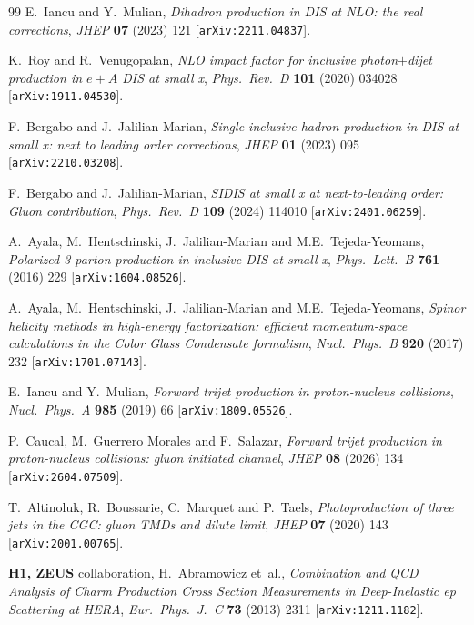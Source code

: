 \documentclass[11pt,a4paper]{article}
\numberwithin{equation}{section}
\begin{document}
\begin{thebibliography}{99}
E.~Iancu and Y.~Mulian, \emph{Dihadron production in DIS at NLO: the real corrections},
\emph{JHEP} {\bf 07} (2023) 121 [\texttt{arXiv:2211.04837}].

K.~Roy and R.~Venugopalan, \emph{NLO impact factor for inclusive photon$+$dijet production in
$e+A$ DIS at small x}, \emph{Phys.\ Rev.\ D} {\bf 101} (2020) 034028
[\texttt{arXiv:1911.04530}].

F.~Bergabo and J.~Jalilian-Marian, \emph{Single inclusive hadron production in DIS at small
x: next to leading order corrections}, \emph{JHEP} {\bf 01} (2023) 095
[\texttt{arXiv:2210.03208}].

F.~Bergabo and J.~Jalilian-Marian, \emph{SIDIS at small x at next-to-leading order: Gluon
contribution}, \emph{Phys.\ Rev.\ D} {\bf 109} (2024) 114010 [\texttt{arXiv:2401.06259}].

A.~Ayala, M.~Hentschinski, J.~Jalilian-Marian and M.E.~Tejeda-Yeomans, \emph{Polarized 3
parton production in inclusive DIS at small x}, \emph{Phys.\ Lett.\ B} {\bf 761} (2016) 229
[\texttt{arXiv:1604.08526}].

A.~Ayala, M.~Hentschinski, J.~Jalilian-Marian and M.E.~Tejeda-Yeomans, \emph{Spinor helicity
methods in high-energy factorization: efficient momentum-space calculations in the Color
Glass Condensate formalism}, \emph{Nucl.\ Phys.\ B} {\bf 920} (2017) 232
[\texttt{arXiv:1701.07143}].

E.~Iancu and Y.~Mulian, \emph{Forward trijet production in proton-nucleus collisions},
\emph{Nucl.\ Phys.\ A} {\bf 985} (2019) 66 [\texttt{arXiv:1809.05526}].

P.~Caucal, M.~Guerrero Morales and F.~Salazar, \emph{Forward trijet production in
proton-nucleus collisions: gluon initiated channel}, \emph{JHEP} {\bf 08} (2026) 134
[\texttt{arXiv:2604.07509}].

T.~Altinoluk, R.~Boussarie, C.~Marquet and P.~Taels, \emph{Photoproduction of three jets in
the CGC: gluon TMDs and dilute limit}, \emph{JHEP} {\bf 07} (2020) 143
[\texttt{arXiv:2001.00765}].

{\bf H1, ZEUS} collaboration, H.~Abramowicz et~al., \emph{Combination and QCD Analysis of
Charm Production Cross Section Measurements in Deep-Inelastic ep Scattering at HERA},
\emph{Eur.\ Phys.\ J.\ C} {\bf 73} (2013) 2311 [\texttt{arXiv:1211.1182}].


\end{thebibliography}
\end{document}
